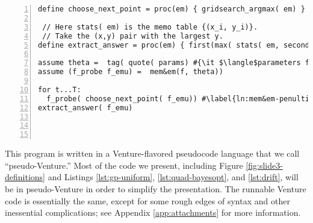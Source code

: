 \begin{lstlisting}[frame=single,escapechar=\#,numbers=left,numbersep=5pt,numberstyle=\tiny\color{gray}]
define choose_next_point = proc(em) { gridsearch_argmax( em) }

 // Here stats( em) is the memo table {(x_i, y_i)}.
 // Take the (x,y) pair with the largest y.
define extract_answer = proc(em) { first(max( stats( em, second)))}
 
assume theta =  tag( quote( params) #{\it $\langle$parameters for the statistical emulator$\rangle$}#))
assume (f_probe f_emu) =  mem&em(f, theta))

for t...T:
  f_probe( choose_next_point( f_emu)) #\label{ln:mem&em-penultimate}#
extract_answer( f_emu)    
    
       
      
\end{lstlisting}
This program is written in a Venture-flavored pseudocode language that we call
``pseudo-Venture.''  Most of the code we present, including Figure
\ref{fig:slide3-definitions} and Listings \ref{lst:gp-uniform},
\ref{lst:quad-bayesopt}, and \ref{lst:drift}, will be in pseudo-Venture in order
to simplify the presentation.  The runnable Venture code is essentially the
same, except for some rough edges of syntax and other inessential complications;
see Appendix \ref{app:attachments} for more information.

